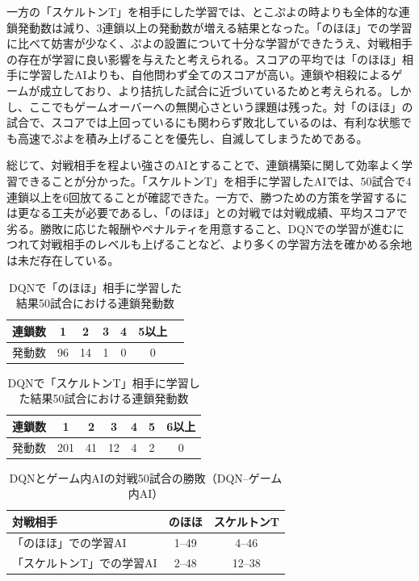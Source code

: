 \documentclass[12pt]{jreport}
\begin{document}
一方の「スケルトンT」を相手にした学習では、とこぷよの時よりも全体的な連鎖発動数は減り、3連鎖以上の発動数が増える結果となった。「のほほ」での学習に比べて妨害が少なく、ぷよの設置について十分な学習ができたうえ、対戦相手の存在が学習に良い影響を与えたと考えられる。スコアの平均では「のほほ」相手に学習したAIよりも、自他問わず全てのスコアが高い。連鎖や相殺によるゲームが成立しており、より拮抗した試合に近づいているためと考えられる。しかし、ここでもゲームオーバーへの無関心さという課題は残った。対「のほほ」の試合で、スコアでは上回っているにも関わらず敗北しているのは、有利な状態でも高速でぷよを積み上げることを優先し、自滅してしまうためである。

総じて、対戦相手を程よい強さのAIとすることで、連鎖構築に関して効率よく学習できることが分かった。「スケルトンT」を相手に学習したAIでは、50試合で4連鎖以上を6回放てることが確認できた。一方で、勝つための方策を学習するには更なる工夫が必要であるし、「のほほ」との対戦では対戦成績、平均スコアで劣る。勝敗に応じた報酬やペナルティを用意すること、DQNでの学習が進むにつれて対戦相手のレベルも上げることなど、より多くの学習方法を確かめる余地は未だ存在している。


\begin{table}[tb]
\begin{center}
\caption{DQNで「のほほ」相手に学習した結果50試合における連鎖発動数} \label{tab:dqn_chain_nohoho}
\begin{tabular}{|l|c|c|c|c|c|c|} \hline
連鎖数 & 1 & 2 & 3 & 4 & 5以上\\ \hline
発動数 & 96 & 14 & 1 & 0 & 0\\ \hline
\end{tabular}
\end{center}
\end{table}

\begin{table}[tb]
\begin{center}
\caption{DQNで「スケルトンT」相手に学習した結果50試合における連鎖発動数} \label{tab:dqn_chain_sket}
\begin{tabular}{|l|c|c|c|c|c|c|} \hline
連鎖数 & 1 & 2 & 3 & 4 & 5 & 6以上\\ \hline
発動数 & 201 & 41 & 12 & 4 & 2 & 0\\ \hline
\end{tabular}
\end{center}
\end{table}


\begin{table}[tb]
\begin{center}
\caption{DQNとゲーム内AIの対戦50試合の勝敗（DQN--ゲーム内AI）} \label{tab:dqn_win_vs}
\begin{tabular}{|l|c|c|} \hline
対戦相手 & のほほ & スケルトンT\\ \hline
「のほほ」での学習AI & 1--49 & 4--46\\ \hline
「スケルトンT」での学習AI & 2--48 & 12--38\\ \hline
\end{tabular}
\end{center}
\end{table}
\end{document}

